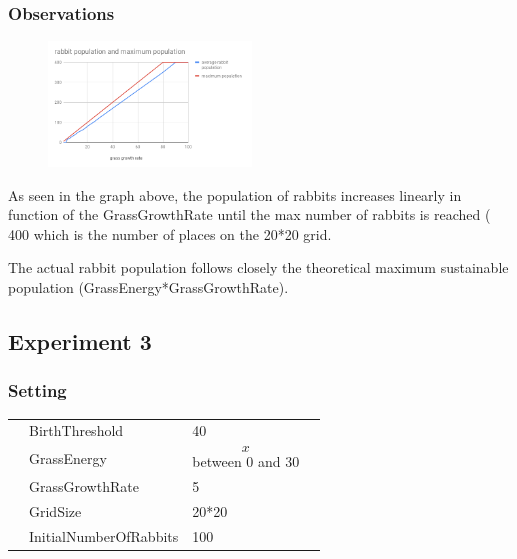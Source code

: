 \documentclass[11pt]{article}
\begin{document}
 \subsubsection{Observations}
 
  \begin{figure}
  \vspace{-20pt}
  \begin{center}
    \includegraphics[width=0.48\textwidth]{grassgrowth.png}
  \end{center}
  \vspace{-20pt}
\end{figure}
 
 As seen in the graph above, the population of rabbits increases linearly in function of the GrassGrowthRate until the max number of rabbits is reached ( 400 which is the number of places on the 20*20 grid.

 The actual rabbit population follows closely the theoretical maximum sustainable population (GrassEnergy*GrassGrowthRate).


 \subsection{Experiment 3}
 \subsubsection{Setting}
 \begin{table}[H]
  \begin{tabular}{llll}
   &BirthThreshold  &40\\
   &GrassEnergy  & $$x$$ between 0 and 30 \\
   &GrassGrowthRate  &5\\
   &GridSize  &20*20\\
   &InitialNumberOfRabbits  &100
  \end{tabular}
 \end{table}
\end{document}

